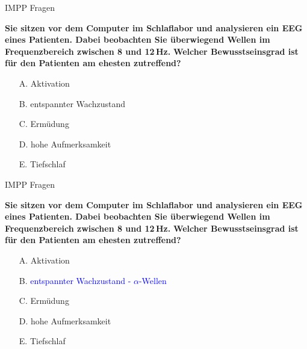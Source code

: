 \documentclass{beamer}
\begin{document}

\begin{frame}{IMPP Fragen}

\textbf{Sie sitzen vor dem Computer im Schlaflabor und analysieren ein EEG eines Patienten. Dabei beobachten Sie überwiegend Wellen im Frequenzbereich zwischen 8 und 12\,Hz. }
\textbf{Welcher Bewusstseinsgrad ist für den Patienten am ehesten zutreffend?} \\[0.2 cm]

\begin{itemize}
\item[A.] Aktivation
\item[B.] entspannter Wachzustand
\item[C.] Ermüdung
\item[D.] hohe Aufmerksamkeit
\item[E.] Tiefschlaf
\end{itemize}

\end{frame}


\begin{frame}{IMPP Fragen}

\textbf{Sie sitzen vor dem Computer im Schlaflabor und analysieren ein EEG eines Patienten. Dabei beobachten Sie überwiegend Wellen im Frequenzbereich zwischen 8 und 12\,Hz. }
\textbf{Welcher Bewusstseinsgrad ist für den Patienten am ehesten zutreffend?} \\[0.2 cm]

\begin{itemize}
\item[A.] Aktivation
\item[B.] \textcolor{blue}{entspannter Wachzustand  - \(\alpha\)-Wellen}  
\item[C.] Ermüdung
\item[D.] hohe Aufmerksamkeit
\item[E.] Tiefschlaf
\end{itemize}

\end{frame}





\end{document}
